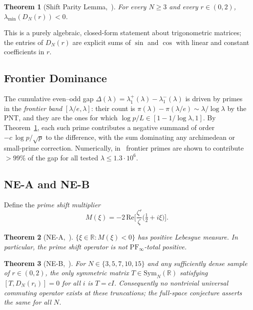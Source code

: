 \documentclass[12pt,a4paper]{article}
\newtheorem{theorem}{Theorem}[section]
\theoremstyle{definition}
\theoremstyle{remark}
\newcommand{\RR}{\mathbb{R}}
\begin{document}
\begin{theorem}[Shift Parity Lemma,~\cite{Geiger2026partII}]
\label{thm:SPL}
For every $N \ge 3$ and every $r \in (0, 2)$, $\lambda_{\min}(D_N(r)) < 0$.
\end{theorem}

This is a purely algebraic, closed-form statement about trigonometric
matrices; the entries of $D_N(r)$ are explicit sums of $\sin$ and $\cos$
with linear and constant coefficients in $r$.

\subsection{Frontier Dominance}

The cumulative even--odd gap $\Delta(\lambda) = \lambda_1^+(\lambda) - \lambda_1^-(\lambda)$
is driven by primes in the \emph{frontier band} $[\lambda/e, \lambda]$: their
count is $\pi(\lambda) - \pi(\lambda/e) \sim \lambda/\log\lambda$ by the PNT,
and they are the ones for which $\log p / L \in [1-1/\log\lambda, 1]$. By
Theorem~\ref{thm:SPL}, each such prime contributes a negative summand of
order $-c\,\log p / \sqrt{p}$ to the difference, with the sum dominating any
archimedean or small-prime correction. Numerically, in~\cite{Geiger2026partII}
frontier primes are shown to contribute $> 99\%$ of the gap for all tested
$\lambda \le 1.3\cdot 10^6$.

\subsection{NE-A and NE-B}

Define the \emph{prime shift multiplier}
\begin{equation}
\label{eq:Mxi}
M(\xi) = -2\,\mathrm{Re}\Big[\frac{\zeta'}{\zeta}\Big(\tfrac{1}{2}+i\xi\Big)\Big].
\end{equation}

\begin{theorem}[NE-A,~\cite{Geiger2026partII}]
\label{thm:NEA-riemann}
$\{\xi \in \RR : M(\xi) < 0\}$ has positive Lebesgue measure. In particular,
the prime shift operator is not $\mathrm{PF}_\infty$-total positive.
\end{theorem}

\begin{theorem}[NE-B,~\cite{Geiger2026partII}]
\label{thm:NEB-riemann}
For $N \in \{3,5,7,10,15\}$ and any sufficiently dense sample of $r \in (0,2)$,
the only symmetric matrix $T \in \mathrm{Sym}_N(\RR)$ satisfying
$[T, D_N(r_i)] = 0$ for all $i$ is $T = cI$. Consequently no nontrivial
universal commuting operator exists at these truncations; the full-space
conjecture \cite[Conjecture~5.3]{Geiger2026partII} asserts the same for
all $N$.
\end{theorem}
\end{document}
